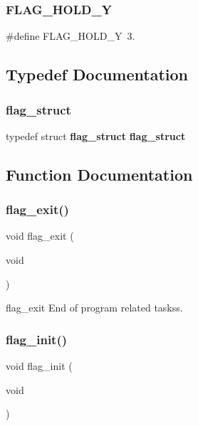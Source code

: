 \subsubsection{F\+L\+A\+G\+\_\+\+H\+O\+L\+D\+\_\+Y}
{\footnotesize\ttfamily \#define F\+L\+A\+G\+\_\+\+H\+O\+L\+D\+\_\+Y~3.}



\subsection{Typedef Documentation}
\mbox{\label{flag_8h_a37e8a58da64d1152639cc06f3fb52dfd}} 
\subsubsection{flag\+\_\+struct}
{\footnotesize\ttfamily typedef struct \textbf{ flag\+\_\+struct}  \textbf{ flag\+\_\+struct}}



\subsection{Function Documentation}
\mbox{\label{flag_8h_a093f6ca0d3ecd0ff42a97d5584a17b16}} 
\subsubsection{flag\+\_\+exit()}
{\footnotesize\ttfamily void flag\+\_\+exit (\begin{DoxyParamCaption}\item[{void}]{ }\end{DoxyParamCaption})}

flag\+\_\+exit End of program related taskss. \mbox{\label{flag_8h_a48860dbc8264329bfb945a28588ea0ac}} 
\subsubsection{flag\+\_\+init()}
{\footnotesize\ttfamily void flag\+\_\+init (\begin{DoxyParamCaption}\item[{void}]{ }\end{DoxyParamCaption})}

